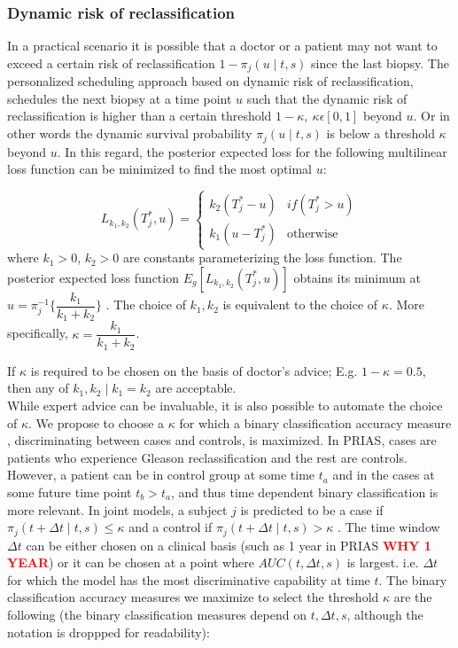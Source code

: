 \subsubsection{Dynamic risk of reclassification}
\label{subsubsec : dynamic_risk_definitions}
In a practical scenario it is possible that a doctor or a patient may not want to exceed a certain risk of reclassification $1 - \pi_j(u \mid t, s)$ since the last biopsy. The personalized scheduling approach based on dynamic risk of reclassification, schedules the next biopsy at a time point $u$ such that the dynamic risk of reclassification is higher than a certain threshold $1-\kappa,\ \kappa \epsilon [0,1]$ beyond $u$. Or in other words the dynamic survival probability $\pi_j(u \mid t, s)$ is below a threshold $\kappa$ beyond $u$. In this regard, the posterior expected loss for the following multilinear loss function can be minimized to find the most optimal $u$:

\begin{equation}
\label{eq : loss_dynamic_risk}
L_{k_1, k_2}(T^*_j, u) =
    \begin{cases}
      k_2(T^*_j-u) & if(T^*_j > u)\\
      k_1(u-T^*_j) & \text{otherwise}
    \end{cases}       
\end{equation}
where $k_1 > 0$, $k_2 > 0$ are constants parameterizing the loss function. The posterior expected loss function $E_g[L_{k_1, k_2}(T^*_j, u)]$ obtains its minimum at $u = \pi_j^{-1}\Big\{\dfrac{k_1}{k_1 + k_2}\Big\}$ \citep{robertBayesianChoice}. The choice of $k_1, k_2$ is equivalent to the choice of $\kappa$. More specifically, $\kappa = \dfrac{k_1}{k_1 + k_2}$. 

If $\kappa$ is required to be chosen on the basis of doctor's advice; E.g. $1 - \kappa = 0.5$, then any of $k_1, k_2 \mid k_1=k_2$ are acceptable.\\

While expert advice can be invaluable, it is also possible to automate the choice of $\kappa$. We propose to choose a $\kappa$ for which a binary classification accuracy measure \citep{lopez2014optimalcutpoints,sokolova2009systematic}, discriminating between cases and controls, is maximized. In PRIAS, cases are patients who experience Gleason reclassification and the rest are controls. However, a patient can be in control group at some time $t_a$ and in the cases at some future time point $t_b > t_a$, and thus time dependent binary classification is more relevant. In joint models, a subject $j$ is predicted to be a case if $\pi_j(t + \Delta t \mid t,s) \leq \kappa$ and a control if $\pi_j(t + \Delta t \mid t,s) > \kappa$ \citep{rizopoulosJMbayes}. The time window $\Delta t$ can be either chosen on a clinical basis (such as 1 year in PRIAS \textcolor{red}{\textbf{WHY 1 YEAR}}) or it can be chosen at a point where $AUC(t, \Delta t, s)$ \citep{rizopoulosJMbayes} is largest. i.e. $\Delta t$ for which the model has the most discriminative capability at time $t$. The binary classification accuracy measures we maximize to select the threshold $\kappa$ are the following (the binary classification measures depend on $t, \Delta t, s$, although the notation is droppped for readability):

